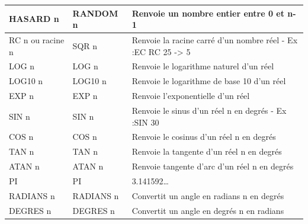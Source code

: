 \begin{table}[htb]
\begin{changemargin}{-3cm}{-3cm}
\begin{tabular}{|l|l|l|}
HASARD n                       & RANDOM n        & Renvoie un nombre entier entre 0 et n-1                               \\ \hline
RC n ou racine n               & SQR n           & Renvoie la racine carré d'un nombre réel - Ex :EC RC 25 -> 5           \\ \hline
LOG n                          & LOG n           & Renvoie le logarithme naturel d'un réel                               \\ \hline
LOG10 n                        & LOG10 n         & Renvoie le logarithme de base 10 d'un réel                            \\ \hline
EXP n                          & EXP n           & Renvoie l'exponentielle d'un réel                                     \\ \hline
SIN n                          & SIN n           & Renvoie le sinus d'un réel n en degrés - Ex :SIN 30                   \\ \hline
COS n                          & COS n           & Renvoie le cosinus d'un réel n en degrés                              \\ \hline
TAN n                          & TAN n           & Renvoie la tangente d'un réel n en degrés                             \\ \hline
ATAN n                         & ATAN n          & Renvoie tangente d'arc d'un réel n en degrés                          \\ \hline
PI                             & PI              & 3.141592…                                                             \\ \hline
RADIANS n                      & RADIANS n       & Convertit un angle en radians n en degrés                             \\ \hline
DEGRES n                       & DEGRES n        & Convertit un angle en degrés n en radians                             \\ \hline
\end{tabular}
\end{changemargin}
\end{table}

